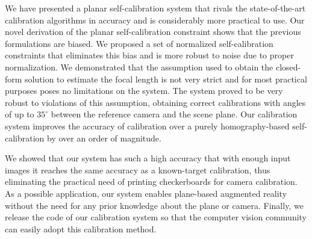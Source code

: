 \documentclass[10pt,twocolumn,letterpaper]{article}
\begin{document}
We have presented a planar self-calibration system that rivals the state-of-the-art calibration algorithms in accuracy and is considerably more practical to use. Our novel derivation of the planar self-calibration constraint shows that the previous formulations are biased. We proposed a set of normalized self-calibration constraints that eliminates this bias and is more robust to noise due to proper normalization. We demonstrated that the assumption used to obtain the closed-form solution to estimate the focal length is not very strict and for most practical purposes poses no limitations on the system. The system proved to be very robust to violations of this assumption, obtaining correct calibrations with angles of up to $35^\circ$ between the reference camera and the scene plane. Our calibration system improves the accuracy of calibration over a purely homography-based self-calibration by over an order of magnitude. 

We showed that our system has such a high accuracy that with enough input images it reaches the same accuracy as a known-target calibration, thus eliminating the practical need of printing checkerboards for camera calibration. As a possible application, our system enables plane-based augmented reality without the need for any prior knowledge about the plane or camera. Finally, we release the code of our calibration system so that the computer vision community can easily adopt this calibration method.

\clearpage

{\small


}
\end{document}
